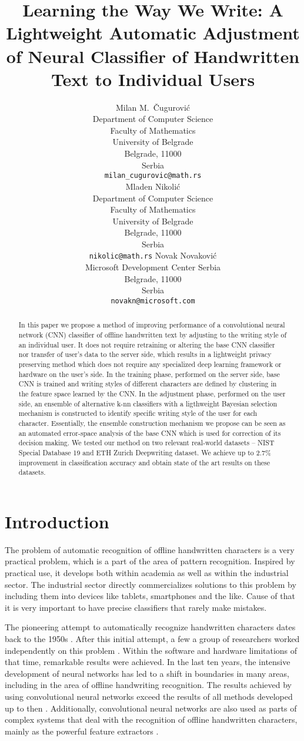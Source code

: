 \documentclass{article}
\title{Learning the Way We Write: A Lightweight Automatic Adjustment of %
Neural Classifier of Handwritten Text to Individual Users}
\author{%
  Milan M.~Čugurović\\
  Department of Computer Science\\
  Faculty of Mathematics\\
  University of Belgrade\\
  Belgrade, 11000\\
  Serbia\\
  \texttt{milan\_cugurovic@math.rs} \\
  \And
  Mladen Nikolić\\
  Department of Computer Science\\
  Faculty of Mathematics\\
  University of Belgrade\\
  Belgrade, 11000\\
  Serbia\\
  \texttt{nikolic@math.rs}
  \And
  Novak Novaković \\
  Microsoft Development Center Serbia\\
  Belgrade, 11000\\
  Serbia\\
  \texttt{novakn@microsoft.com}
}
\begin{document}
\maketitle

\begin{abstract}
  In this paper we propose a method of improving performance of a convolutional neural network (CNN) classifier of offline handwritten text by adjusting to the writing style of an individual user. It does not require retraining or altering the base CNN classifier nor transfer of user's data to the server side, which results in a lightweight privacy preserving method which does not require any specialized deep learning framework or hardware on the user's side. In the training phase, performed on the server side, base CNN is trained and writing styles of different characters are defined by clustering in the feature space learned by the CNN. In the adjustment phase, performed on the user side, an ensemble of alternative k-nn classifiers with a ligthweight Bayesian selection mechanism is constructed to identify specific writing style of the user for each character. Essentially, the ensemble construction mechanism we propose can be seen as an automated error-space analysis of the base CNN which is used for correction of its decision making.
  We tested our method on two relevant real-world datasets -- NIST Special Database 19 and ETH Zurich Deepwriting dataset. We achieve up to 2.7\% improvement in classification accuracy and obtain state of the art results on these datasets.
\end{abstract}

\section{Introduction}
The problem of automatic recognition of offline handwritten characters is a very practical problem, which is a part of the area of pattern recognition.
Inspired by practical use, it develops both within academia as well as within the industrial sector.
The industrial sector directly commercializes solutions to this problem by including them into devices like tablets, smartphones and the like.
Cause of that it is very important to have precise classifiers that rarely make mistakes.

The pioneering attempt to automatically recognize handwritten characters dates back to the 1950s \citet{leedham}.
After this initial attempt, a few a group of researchers worked independently on this problem \citet{plamondon}.
Within the software and hardware limitations of that time, remarkable results were achieved.
In the last ten years, the intensive development of neural networks has led to a shift in boundaries in many areas,
including in the area of offline handwriting recognition.
The results achieved by using convolutional neural networks exceed the results of all methods developed up to then \citet{cnnbest1} \citet{cnnbest2} \citet{cnnbest3}.
Additionally, convolutional neural networks are also used as parts of complex systems that deal with the recognition of offline handwritten characters,
mainly as the powerful feature extractors \citet{cnnrelated1} \citet{cnnrelated2} \citet{cnnrelated3}.
\end{document}
